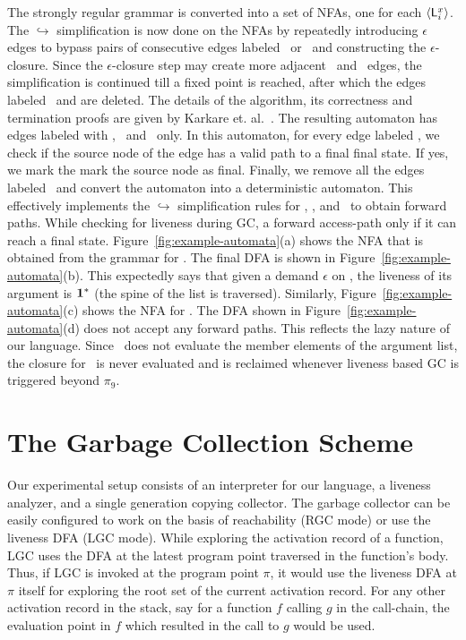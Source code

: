 \documentclass[9pt]{sigplanconf}
\begin{document}
The strongly regular grammar is converted  into a set of NFAs, one for
each $\langle \mathsf{L}_{{i}}^{x}\rangle$.  The $\hookrightarrow$ simplification is now
done on the NFAs by  repeatedly introducing $\epsilon$ edges to bypass
pairs  of consecutive  edges labeled  \bcar\acar\ or  \bcdr\acdr\ and
constructing the $\epsilon$-closure. Since the $\epsilon$-closure step
may  create  more  adjacent  \bcar\acar\ and  \bcdr\acdr\  edges,  the
simplification is continued till a fixed point is reached, after which
the edges labeled \bcar \ and  \bcdr are deleted.  The details of the
algorithm, its correctness and termination proofs are given by Karkare
et.  al.~\cite{karkare07liveness,asati14lgc}.  The resulting automaton
has  edges labeled  with  \acar,  \acdr\ and  \clazy\  only. In  this
automaton, for every edge labeled \clazy, we check if the source node
of the edge has a valid path to  a final final state.  If yes, we mark
the mark  the source node as  final. Finally, we remove  all the edges
labeled  \clazy\  and  convert  the automaton  into  a  deterministic
automaton.    This   effectively  implements   the   $\hookrightarrow$
simplification rules for  \bcar, \bcdr, and \clazy\  to obtain forward
paths. While  checking for liveness  during GC, a  forward access-path
only if it can reach a final state.
Figure~\ref{fig:example-automata}(a)  shows the  NFA that  is obtained
from the grammar for .  The final DFA is shown in
Figure~\ref{fig:example-automata}(b).  This expectedly says that given
a  demand $\epsilon$  on  \length,  the liveness  of  its argument  is
$\mathbf{1}^{*}$  (the  spine  of   the  list  is  traversed).   Similarly,
Figure~\ref{fig:example-automata}(c)     shows     the     NFA     for
.          The         DFA         shown         in
Figure~\ref{fig:example-automata}(d)  does  not   accept  any  forward
paths.   This  reflects  the  lazy  nature  of  our  language.   Since
\length\ does not  evaluate the member elements of  the argument list,
the  closure for  \pa\ is  never evaluated  and is  reclaimed whenever
liveness based GC is triggered beyond $\pi_9$.


\section{The Garbage Collection Scheme}
\label{sec:GC-scheme}
Our experimental setup consists of  an interpreter for our language, a
liveness  analyzer, and  a single  generation copying  collector.  The
garbage collector  can be  easily configured to  work on the  basis of
reachability (RGC  mode) or use  the liveness DFA (LGC  mode).  While
exploring the  activation record of a  function, LGC uses  the DFA at
the latest program  point traversed in the function's  body.  Thus, if
LGC is invoked  at the program point $\pi$, it  would use the liveness
DFA  at  $\pi$ itself  for  exploring the  root  set  of the  current
activation record. For  any other activation record in  the stack, say
for a function ${\mathit f}$  calling ${\mathit g}$ in the call-chain,
the evaluation  point in ${\mathit f}$  which resulted in  the call to
${\mathit g}$ would be used.
\end{document}
